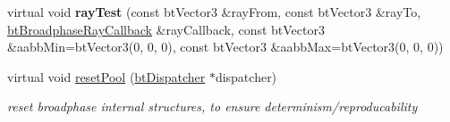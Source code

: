 \begin{DoxyCompactItemize}
\item 
\hypertarget{classbt_gpu3_d_grid_broadphase_a56834601991a6ee9b12a691acdbd183b}{virtual void {\bfseries ray\+Test} (const bt\+Vector3 \&ray\+From, const bt\+Vector3 \&ray\+To, \hyperlink{structbt_broadphase_ray_callback}{bt\+Broadphase\+Ray\+Callback} \&ray\+Callback, const bt\+Vector3 \&aabb\+Min=bt\+Vector3(0, 0, 0), const bt\+Vector3 \&aabb\+Max=bt\+Vector3(0, 0, 0))}\label{classbt_gpu3_d_grid_broadphase_a56834601991a6ee9b12a691acdbd183b}

\item 
\hypertarget{classbt_gpu3_d_grid_broadphase_a2ba7288d1f24ee65d317fb36c3a4c1f1}{virtual void \hyperlink{classbt_gpu3_d_grid_broadphase_a2ba7288d1f24ee65d317fb36c3a4c1f1}{reset\+Pool} (\hyperlink{classbt_dispatcher}{bt\+Dispatcher} $\ast$dispatcher)}\label{classbt_gpu3_d_grid_broadphase_a2ba7288d1f24ee65d317fb36c3a4c1f1}

\begin{DoxyCompactList}\small\item\em reset broadphase internal structures, to ensure determinism/reproducability \end{DoxyCompactList}\end{DoxyCompactItemize}
